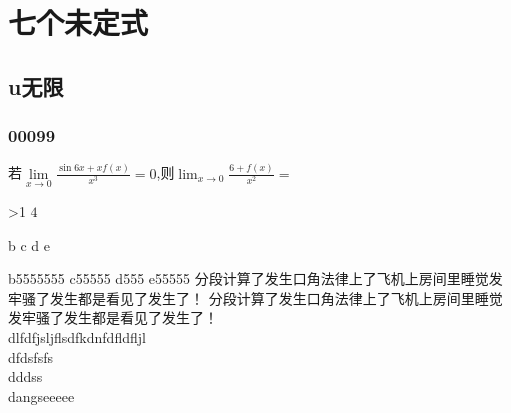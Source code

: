 \section{七个未定式}
\subsection{u无限}
\subsubsection{00099}
\begin{examples}
	若$\lim\limits_{x\to0}{\frac{\sin{6x}+xf(x)}{x^3}}=0$,则$\lim_{x\to0}{\frac{6+f(x)}{x^2}}=$

\end{examples}


\ifnum \value{page}>1
	$4$
\fi

			{b}
			{c}
			{d}
			{e}

			{b5555555}
			{c55555}
			{d555}
			{e55555}
			分段计算了发生口角法律上了飞机上房间里睡觉发牢骚了发生都是看见了发生了！
			分段计算了发生口角法律上了飞机上房间里睡觉发牢骚了发生都是看见了发生了！\\
	dlfdfjsljflsdfkdnfdfldfljl \\
	dfdsfsfs \\
	dddss\\
	dangseeeee

